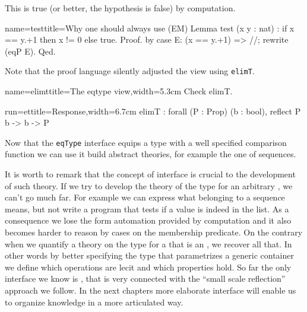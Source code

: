 This is true (or better, the hypothesis is false) by computation.

\begin{coq}{name=test}{title=Why one should always use \C{==} (EM)}
Lemma test (x y : nat) : if x == y.+1 then x != 0 else true.
Proof. by case E: (x == y.+1) => //; rewrite (eqP E). Qed.
\end{coq}





Note that the proof language silently adjusted the view
using \lstinline/elimT/.

\begin{coq}{name=elimt}{title=The eqtype view,width=5.3cm}
Check elimT.

\end{coq}
\begin{coqout}{run=et}{title=Response,width=6.7cm}
elimT : forall (P : Prop) (b : bool),
          reflect P b -> b -> P
\end{coqout}

\mcbREQUIRE{}
\mcbPROVIDE{\\in}
\label{sec:seqtypetheory}

Now that the \lstinline/eqType/ interface equips a type with a well
specified comparison function we can use it build abstract theories,
for example the one of sequences.

It is worth to remark that the concept of interface is crucial to
the development of such theory.  If we try to develop the theory
of the type  for an arbitrary , we can't go much far.
For example we can express what belonging to a sequence means, but
not write a program that tests if a value is indeed in the list.  As a
consequence we lose the form automation provided by computation
and it also becomes harder to reason by cases on the membership predicate.
On the contrary when we quantify a theory on the type   for a
 that is an , we recover all that.  In other words
by better specifying the type that parametrizes a generic container
we define which operations are lecit and which properties hold.
So far the only interface we know is , that is very
connected with the ``small scale reflection'' approach we follow.
In the next chapters more elaborate interface will enable us to
organize knowledge in a more articulated way.

